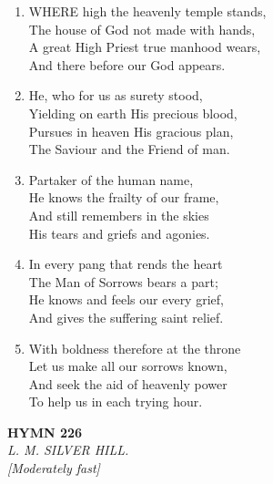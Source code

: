 \documentclass[11pt,a4paper]{article}
\begin{document}
\begin{enumerate}
    \item WHERE high the heavenly temple stands, \\
        The house of God not made with hands, \\
        A great High Priest true manhood wears, \\
        And there before our God appears.

    \item He, who for us as surety stood, \\
        Yielding on earth His precious blood, \\
        Pursues in heaven His gracious plan, \\
        The Saviour and the Friend of man.

    \item Partaker of the human name, \\
        He knows the frailty of our frame, \\
        And still remembers in the skies \\
        His tears and griefs and agonies.

    \item In every pang that rends the heart \\
        The Man of Sorrows bears a part; \\
        He knows and feels our every grief, \\
        And gives the suffering saint relief.

    \item With boldness therefore at the throne \\
        Let us make all our sorrows known, \\
        And seek the aid of heavenly power \\
        To help us in each trying hour.

\end{enumerate}

\newpage
\begin{center}
    {\Large \textbf{HYMN 226}}
    \\
    \textit{L. M. SILVER HILL.}
    \\
    \textit{\small [Moderately fast]}
\end{center}
\vspace{1em}
\end{document}
